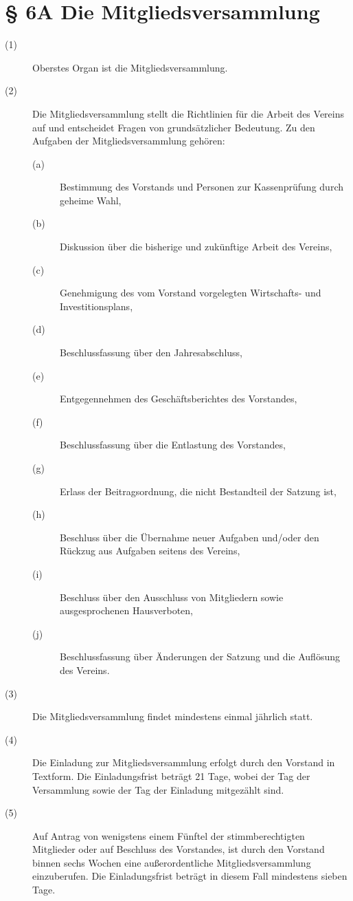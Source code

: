 \documentclass[a4paper,12pt]{scrartcl}
\begin{document}
\section*{\S{} 6A Die Mitgliedsversammlung}
\begin{description} 

\item[(1)] Oberstes Organ ist die Mitgliedsversammlung.
\item[(2)] Die Mitgliedsversammlung stellt die Richtlinien für die Arbeit des Vereins auf und entscheidet Fragen von grundsätzlicher Bedeutung. Zu den Aufgaben der Mitgliedsversammlung gehören:
\begin{description} 
\item[(a)]  Bestimmung des Vorstands und Personen zur Kassenprüfung durch geheime Wahl,
\item[(b)] Diskussion über die bisherige und zukünftige Arbeit des Vereins,
\item[(c)] Genehmigung des vom Vorstand vorgelegten Wirtschafts- und Investitionsplans,
\item[(d)] Beschlussfassung über den Jahresabschluss,
\item[(e)] Entgegennehmen des Geschäftsberichtes des Vorstandes,
\item[(f)] Beschlussfassung über die Entlastung des Vorstandes,
\item[(g)] Erlass der Beitragsordnung, die nicht Bestandteil der Satzung ist,
\item[(h)] Beschluss über die Übernahme neuer Aufgaben und/oder den Rückzug aus Aufgaben seitens des Vereins,
\item[(i)] Beschluss über den Ausschluss von Mitgliedern sowie ausgesprochenen Hausverboten,
\item[(j)] Beschlussfassung über Änderungen der Satzung und die Auflösung des Vereins.
\end{description}
\item[(3)] Die Mitgliedsversammlung findet mindestens einmal jährlich statt.
\item[(4)] Die Einladung zur Mitgliedsversammlung erfolgt durch den Vorstand in Textform. Die Einladungsfrist beträgt 21 Tage, wobei der Tag der Versammlung sowie der Tag der Einladung mitgezählt sind.
\item[(5)] Auf Antrag von wenigstens einem Fünftel der stimmberechtigten Mitglieder oder auf Beschluss des Vorstandes, ist durch den Vorstand binnen sechs Wochen eine außerordentliche Mitgliedsversammlung einzuberufen. Die Einladungsfrist beträgt in diesem Fall mindestens sieben Tage.

\end{description}
\end{document}
